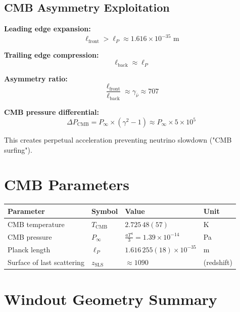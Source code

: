 \documentclass{article}
\begin{document}
\subsection{CMB Asymmetry Exploitation}

\textbf{Leading edge expansion:}
\begin{equation}
\ell_{\text{front}} > \ell_P \approx 1.616 \times 10^{-35} \text{ m}
\end{equation}

\textbf{Trailing edge compression:}
\begin{equation}
\ell_{\text{back}} \approx \ell_P
\end{equation}

\textbf{Asymmetry ratio:}
\begin{equation}
\frac{\ell_{\text{front}}}{\ell_{\text{back}}} \approx \gamma_{\bar{\nu}} \approx 707
\end{equation}

\textbf{CMB pressure differential:}
\begin{equation}
\Delta P_{\text{CMB}} = P_{\infty} \times (\gamma^2 - 1) \approx P_{\infty} \times 5 \times 10^5
\end{equation}

This creates perpetual acceleration preventing neutrino slowdown ("CMB surfing").

\section{CMB Parameters}

\begin{longtable}{llll}
\toprule
\textbf{Parameter} & \textbf{Symbol} & \textbf{Value} & \textbf{Unit} \\
\midrule
CMB temperature & $T_{\text{CMB}}$ & $2.725\,48(57)$ & K \\
CMB pressure & $P_{\infty}$ & $\frac{aT^4}{3} = 1.39 \times 10^{-14}$ & Pa \\
Planck length & $\ell_P$ & $1.616\,255(18) \times 10^{-35}$ & m \\
Surface of last scattering & $z_{\text{SLS}}$ & $\approx 1090$ & (redshift) \\
\bottomrule
\end{longtable}

\section{Windout Geometry Summary}
\end{document}
